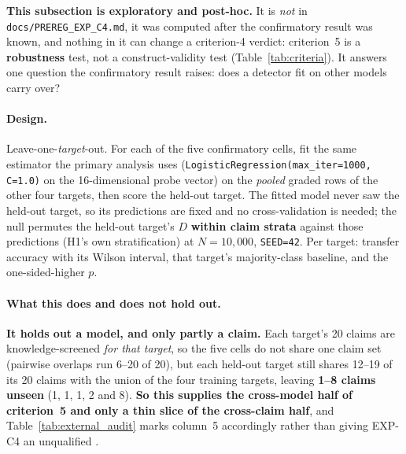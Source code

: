 \textbf{This subsection is exploratory and post-hoc.} It is \emph{not} in \texttt{docs/PREREG\_EXP\_C4.md}, it was computed after the confirmatory result was known, and nothing in it can change a criterion-4 verdict: criterion~5 is a \textbf{robustness} test, not a construct-validity test (Table~\ref{tab:criteria}). It answers one question the confirmatory result raises: does a detector fit on other models carry over?

\paragraph{Design.} Leave-one-\emph{target}-out. For each of the five confirmatory cells, fit the same estimator the primary analysis uses (\texttt{LogisticRegression(max\_iter=1000, C=1.0)} on the 16-dimensional probe vector) on the \emph{pooled} graded rows of the other four targets, then score the held-out target. The fitted model never saw the held-out target, so its predictions are fixed and no cross-validation is needed; the null permutes the held-out target's $D$ \textbf{within claim strata} against those predictions (H1's own stratification) at $N\!=\!10{,}000$, \texttt{SEED=42}. Per target: transfer accuracy with its Wilson interval, that target's majority-class baseline, and the one-sided-higher $p$.

\paragraph{What this does and does not hold out.} \textbf{It holds out a model, and only partly a claim.} Each target's 20 claims are knowledge-screened \emph{for that target}, so the five cells do not share one claim set (pairwise overlaps run 6--20 of 20), but each held-out target still shares 12--19 of its 20 claims with the union of the four training targets, leaving \textbf{1--8 claims unseen} (1, 1, 1, 2 and 8). \textbf{So this supplies the cross-model half of criterion~5 and only a thin slice of the cross-claim half}, and Table~\ref{tab:external_audit} marks column~5 accordingly rather than giving EXP-C4 an unqualified \checkmark.

